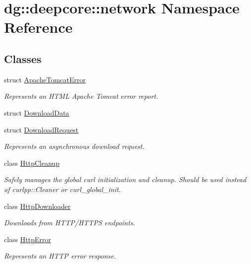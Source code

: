 \hypertarget{namespacedg_1_1deepcore_1_1network}{}\section{dg\+:\+:deepcore\+:\+:network Namespace Reference}
\label{namespacedg_1_1deepcore_1_1network}
\subsection*{Classes}
\begin{DoxyCompactItemize}
\item 
struct \hyperlink{structdg_1_1deepcore_1_1network_1_1_apache_tomcat_error}{Apache\+Tomcat\+Error}
\begin{DoxyCompactList}\small\item\em Represents an H\+T\+ML Apache Tomcat error report. \end{DoxyCompactList}\item 
struct \hyperlink{structdg_1_1deepcore_1_1network_1_1_download_data}{Download\+Data}
\item 
struct \hyperlink{structdg_1_1deepcore_1_1network_1_1_download_request}{Download\+Request}
\begin{DoxyCompactList}\small\item\em Represents an asynchronous download request. \end{DoxyCompactList}\item 
class \hyperlink{classdg_1_1deepcore_1_1network_1_1_http_cleanup}{Http\+Cleanup}
\begin{DoxyCompactList}\small\item\em Safely manages the global curl initialization and cleanup. Should be used instead of curlpp\+::\+Cleaner or curl\+\_\+global\+\_\+init. \end{DoxyCompactList}\item 
class \hyperlink{classdg_1_1deepcore_1_1network_1_1_http_downloader}{Http\+Downloader}
\begin{DoxyCompactList}\small\item\em Downloads from H\+T\+T\+P/\+H\+T\+T\+PS endpoints. \end{DoxyCompactList}\item 
class \hyperlink{classdg_1_1deepcore_1_1network_1_1_http_error}{Http\+Error}
\begin{DoxyCompactList}\small\item\em Represents an H\+T\+TP error response. \end{DoxyCompactList}\item 

\end{DoxyCompactItemize}
